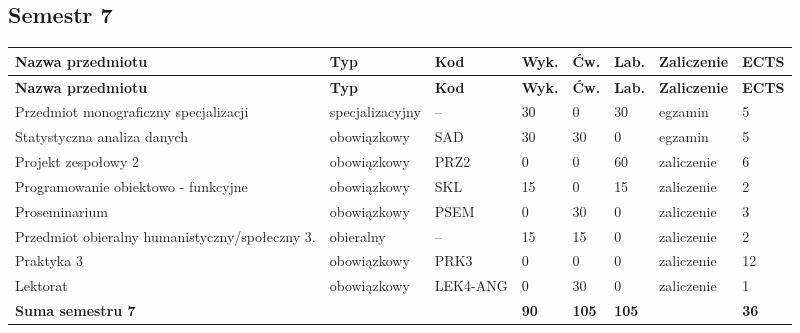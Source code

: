 \documentclass[12pt,a4paper]{article}
\newcommand{\thdrule}{\noalign{\global\setlength{\extrarowheight}{0pt}}}
\newcommand{\thdend}{\noalign{\global\setlength{\extrarowheight}{4pt}}}
\begin{document}
\clearpage
\subsection*{Semestr 7}

{\scriptsize
\begin{longtable}{>{\RaggedRight}m{5.0cm}m{1.9cm}m{0.75cm}m{0.85cm}m{0.85cm}m{0.85cm}m{1.45cm}m{0.9cm}}
\thdrule\toprule
\rowcolor{pjatkRed}
{\color{white}\footnotesize\textbf{\vphantom{Ag}Nazwa przedmiotu}} & {\color{white}\footnotesize\textbf{\vphantom{Ag}Typ}} & {\color{white}\footnotesize\textbf{\vphantom{Ag}Kod}} & {\color{white}\footnotesize\textbf{\vphantom{Ag}Wyk.}} & {\color{white}\footnotesize\textbf{\vphantom{Ag}Ćw.}} & {\color{white}\footnotesize\textbf{\vphantom{Ag}Lab.}} & {\color{white}\footnotesize\textbf{\vphantom{Ag}Zaliczenie}} & {\color{white}\footnotesize\textbf{\vphantom{Ag}ECTS}} \\
\midrule\thdend
\endfirsthead
\thdrule\toprule
\rowcolor{pjatkRed}
{\color{white}\footnotesize\textbf{\vphantom{Ag}Nazwa przedmiotu}} & {\color{white}\footnotesize\textbf{\vphantom{Ag}Typ}} & {\color{white}\footnotesize\textbf{\vphantom{Ag}Kod}} & {\color{white}\footnotesize\textbf{\vphantom{Ag}Wyk.}} & {\color{white}\footnotesize\textbf{\vphantom{Ag}Ćw.}} & {\color{white}\footnotesize\textbf{\vphantom{Ag}Lab.}} & {\color{white}\footnotesize\textbf{\vphantom{Ag}Zaliczenie}} & {\color{white}\footnotesize\textbf{\vphantom{Ag}ECTS}} \\
\midrule\thdend
\endhead
\rowcolor{tableElective} Przedmiot monograficzny specjalizacji & {\scriptsize specjalizacyjny} & -- & 30 & 0 & 30 & {\scriptsize egzamin} & 5 \\
\rowcolor{tableRowAlt} Statystyczna analiza danych & {\scriptsize obowiązkowy} & SAD & 30 & 30 & 0 & {\scriptsize egzamin} & 5 \\
\rowcolor{tableRowLight} Projekt zespołowy 2 & {\scriptsize obowiązkowy} & PRZ2 & 0 & 0 & 60 & {\scriptsize zaliczenie} & 6 \\
\rowcolor{tableRowAlt} Programowanie obiektowo - funkcyjne & {\scriptsize obowiązkowy} & SKL & 15 & 0 & 15 & {\scriptsize zaliczenie} & 2 \\
\rowcolor{tableRowLight} Proseminarium & {\scriptsize obowiązkowy} & PSEM & 0 & 30 & 0 & {\scriptsize zaliczenie} & 3 \\
\rowcolor{tableElective} Przedmiot obieralny humanistyczny/społeczny 3. & {\scriptsize obieralny} & -- & 15 & 15 & 0 & {\scriptsize zaliczenie} & 2 \\
\rowcolor{tableRowLight} Praktyka 3 & {\scriptsize obowiązkowy} & PRK3 & 0 & 0 & 0 & {\scriptsize zaliczenie} & 12 \\
\rowcolor{tableRowAlt} Lektorat & {\scriptsize obowiązkowy} & LEK4-ANG & 0 & 30 & 0 & {\scriptsize zaliczenie} & 1 \\
\midrule[\heavyrulewidth]
\rowcolor{tableSummary} \textbf{Suma semestru 7} & & & \textbf{90} & \textbf{105} & \textbf{105} & & \textbf{36} \\
\bottomrule
\end{longtable}}
\end{document}
